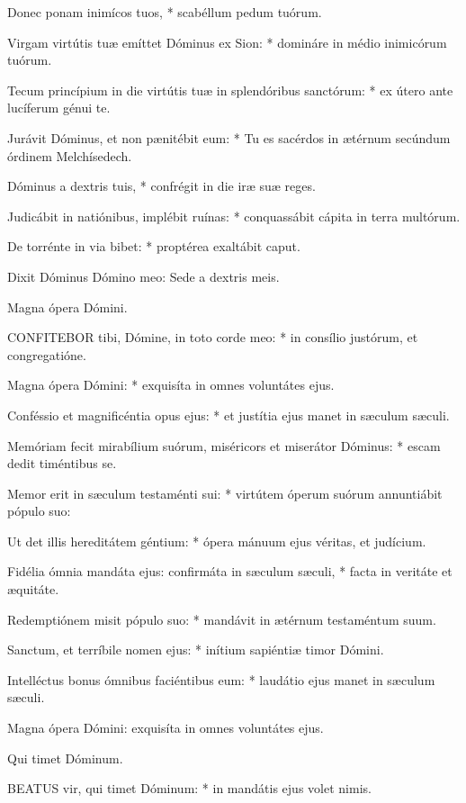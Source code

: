 Donec ponam inimícos tuos, * scabéllum pedum tuórum.

Virgam virtútis tuæ emíttet Dóminus ex Sion: * domináre in médio inimicórum tuórum.

Tecum princípium in die virtútis tuæ in splendóribus sanctórum: * ex útero ante lucíferum génui te.

Jurávit Dóminus, et non pænitébit eum: * Tu es sacérdos in ætérnum secúndum órdinem Melchísedech.

Dóminus a dextris tuis, * confrégit in die iræ suæ reges.

Judicábit in natiónibus, implébit ruínas: * conquassábit cápita in terra multórum.

De torrénte in via bibet: * proptérea exaltábit caput.

 Dixit Dóminus Dómino meo: Sede a dextris meis.

 Magna ópera Dómini.


\lettrine[lines=2]{C}{ONFITEBOR} tibi, Dómine, in toto corde meo: * in consílio justórum, et congregatióne.

Magna ópera Dómini: * exquisíta in omnes voluntátes ejus.

Conféssio et magnificéntia opus ejus: * et justítia ejus manet in sæculum sæculi.

Memóriam fecit mirabílium suórum, miséricors et miserátor Dóminus: * escam dedit timéntibus se.

Memor erit in sæculum testaménti sui: * virtútem óperum suórum annuntiábit pópulo suo:

Ut det illis hereditátem géntium: * ópera mánuum ejus véritas, et judícium.

Fidélia ómnia mandáta ejus: confirmáta in sæculum sæculi, * facta in veritáte et æquitáte.

Redemptiónem misit pópulo suo: * mandávit in ætérnum testaméntum suum.

Sanctum, et terríbile nomen ejus: * inítium sapiéntiæ timor Dómini.

Intelléctus bonus ómnibus faciéntibus eum: * laudátio ejus manet in sæculum sæculi.

 Magna ópera Dómini: exquisíta in omnes voluntátes ejus.

 Qui timet Dóminum.


\lettrine[lines=2]{B}{EATUS} vir, qui timet Dóminum: * in mandátis ejus volet nimis.

